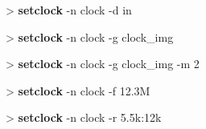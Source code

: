 \documentclass[10pt,a4paper]{article}
\begin{document}
\begin{sampletitle}
> \textbf{\tool{} setclock} -n clock -d in
\end{sampletitle}

\begin{sampletitle}
> \textbf{\tool{} setclock} -n clock -g clock\_img
\end{sampletitle}

\begin{sampletitle}
> \textbf{\tool{} setclock} -n clock -g clock\_img -m 2
\end{sampletitle}

\begin{sampletitle}
> \textbf{\tool{} setclock} -n clock -f 12.3M
\end{sampletitle}

\begin{sampletitle}
> \textbf{\tool{} setclock} -n clock -r 5.5k:12k
\end{sampletitle}
\end{document}
